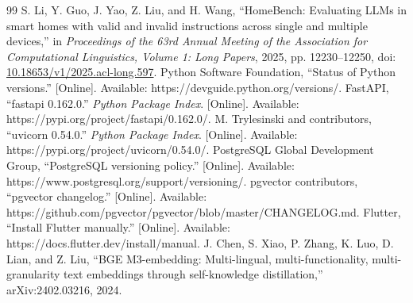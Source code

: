 \documentclass[conference]{IEEEtran}
\begin{document}
\begin{thebibliography}{99}
S. Li, Y. Guo, J. Yao, Z. Liu, and H. Wang, ``HomeBench: Evaluating LLMs in smart homes with valid and invalid instructions across single and multiple devices,'' in \emph{Proceedings of the 63rd Annual Meeting of the Association for Computational Linguistics, Volume 1: Long Papers}, 2025, pp. 12230--12250, doi: \href{https://doi.org/10.18653/v1/2025.acl-long.597}{10.18653/v1/2025.acl-long.597}.
Python Software Foundation, ``Status of Python versions.'' [Online]. Available: https://devguide.python.org/versions/.
FastAPI, ``fastapi 0.162.0.'' \emph{Python Package Index}. [Online]. Available: https://pypi.org/project/fastapi/0.162.0/.
M. Trylesinski and contributors, ``uvicorn 0.54.0.'' \emph{Python Package Index}. [Online]. Available: https://pypi.org/project/uvicorn/0.54.0/.
PostgreSQL Global Development Group, ``PostgreSQL versioning policy.'' [Online]. Available: https://www.postgresql.org/support/versioning/.
pgvector contributors, ``pgvector changelog.'' [Online]. Available: https://github.com/pgvector/pgvector/blob/master/CHANGELOG.md.
Flutter, ``Install Flutter manually.'' [Online]. Available: https://docs.flutter.dev/install/manual.
J. Chen, S. Xiao, P. Zhang, K. Luo, D. Lian, and Z. Liu, ``BGE M3-embedding: Multi-lingual, multi-functionality, multi-granularity text embeddings through self-knowledge distillation,'' arXiv:2402.03216, 2024.
\end{thebibliography}
\end{document}
